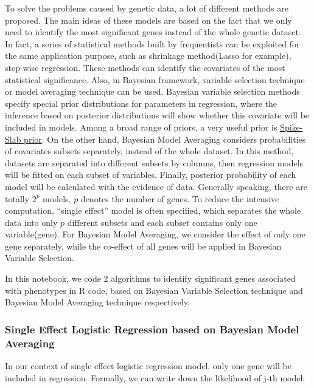 \documentclass[
]{article}
\begin{document}
To solve the problems caused by genetic data, a lot of different methods
are proposed. The main ideas of these models are based on the fact that
we only need to identify the most significant genes instead of the whole
genetic dataset. In fact, a series of statistical methods built by
frequentists can be exploited for the same application purpose, such as
shrinkage method(Lasso for example), step-wise regression. These methods
can identify the covariates of the most statistical significance. Also,
in Bayesian framework, variable selection technique or model averaging
technique can be used. Bayesian variable selection methods specify
special prior distributions for parameters in regression, where the
inference based on posterior distributions will show whether this
covariate will be included in models. Among a broad range of priors, a
very useful prior is
\href{https://en.wikipedia.org/wiki/Spike-and-slab_regression}{Spike-Slab
prior}. On the other hand, Bayesian Model Averaging considers
probabilities of covariates subsets separately, instead of the whole
dataset. In this method, datasets are separated into different subsets
by columns, then regression models will be fitted on each subset of
variables. Finally, posterior probability of each model will be
calculated with the evidence of data. Generally speaking, there are
totally \(2^p\) models, \(p\) denotes the number of genes. To reduce the
intensive computation, ``single effect'' model is often specified, which
separates the whole data into only \(p\) different subsets and each
subset contains only one variable(gene). For Bayesian Model Averaging,
we consider the effect of only one gene separately, while the co-effect
of all genes will be applied in Bayesian Variable Selection.

In this notebook, we code 2 algorithms to identify significant genes
associated with phenotypes in R code, based on Bayesian Variable
Selection technique and Bayesian Model Averaging technique respectively.

\hypertarget{single-effect-logistic-regression-based-on-bayesian-model-averaging}{%
\subsubsection{Single Effect Logistic Regression based on Bayesian Model
Averaging}\label{single-effect-logistic-regression-based-on-bayesian-model-averaging}}

In our context of single effect logistic regression model, only one gene
will be included in regression. Formally, we can write down the
likelihood of j-th model:
\end{document}
